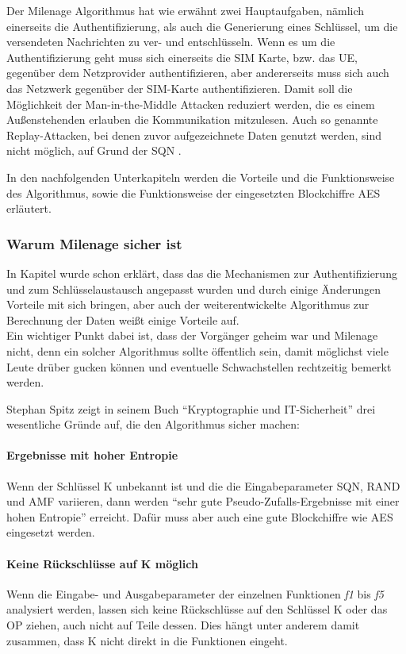 Der Milenage Algorithmus hat wie erwähnt zwei Hauptaufgaben, nämlich einerseits die
Authentifizierung, als auch die Generierung eines Schlüssel, um die versendeten Nachrichten zu
ver- und entschlüsseln. Wenn es um die Authentifizierung geht muss sich einerseits die SIM
Karte, bzw. das \ac{UE}, gegenüber dem Netzprovider authentifizieren, aber andererseits
muss sich auch das Netzwerk gegenüber der SIM-Karte authentifizieren. Damit soll die
Möglichkeit der Man-in-the-Middle Attacken reduziert werden, die es einem Außenstehenden
erlauben die Kommunikation mitzulesen. Auch so genannte Replay-Attacken, bei denen zuvor
aufgezeichnete Daten genutzt werden, sind nicht möglich, auf Grund der \acl{SQN} \cite{spitz11}.

In den nachfolgenden Unterkapiteln werden die Vorteile und die Funktionsweise des
Algorithmus, sowie die Funktionsweise der eingesetzten Blockchiffre \ac{AES} erläutert.

 \subsubsection{Warum Milenage sicher ist}
 In Kapitel  wurde schon erklärt, dass das die Mechanismen
 zur Authentifizierung und zum Schlüsselaustausch angepasst wurden und durch einige
 Änderungen Vorteile mit sich bringen, aber auch der weiterentwickelte Algorithmus zur
 Berechnung der Daten weißt einige Vorteile auf. \\
 Ein wichtiger Punkt dabei ist, dass der Vorgänger geheim war und Milenage nicht, denn ein
 solcher Algorithmus sollte öffentlich sein, damit möglichst viele Leute drüber gucken können und
 eventuelle Schwachstellen rechtzeitig bemerkt werden. 
 
 Stephan Spitz zeigt in seinem Buch ``Kryptographie und IT-Sicherheit''  \cite{spitz11} drei
 wesentliche Gründe auf, die den Algorithmus sicher machen:
 
 \paragraph{Ergebnisse mit hoher Entropie}
 Wenn der Schlüssel \ac{K} unbekannt ist und die die Eingabeparameter \ac{SQN}, \ac{RAND}
 und \ac{AMF} variieren, dann werden ``sehr gute Pseudo-Zufalls-Ergebnisse mit einer hohen
 Entropie'' \cite{spitz11} erreicht. Dafür muss aber auch eine gute Blockchiffre wie AES
 eingesetzt werden.
 
 \paragraph{Keine Rückschlüsse auf K möglich}
 Wenn die Eingabe- und Ausgabeparameter der einzelnen Funktionen \emph{f1} bis \emph{f5}
 analysiert werden, lassen sich keine Rückschlüsse auf den Schlüssel K oder das \acf{OP}
 ziehen, auch nicht auf Teile dessen. Dies hängt unter anderem damit zusammen, dass K nicht
 direkt in die Funktionen eingeht.
 
